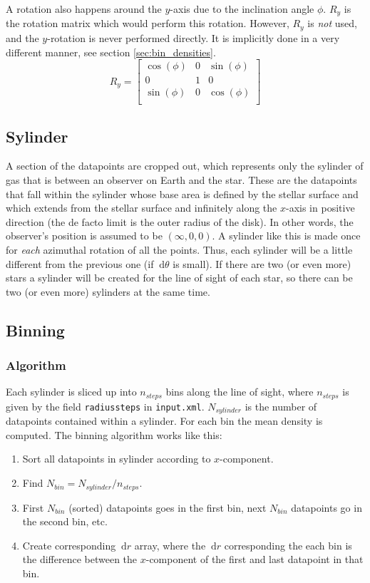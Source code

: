\documentclass[a4paper, 12pt, english, titlepage]{article}
\newcommand{\D}[1]{\ \mathrm{d}#1} %
\begin{document}
    A rotation also happens around the $y$-axis due to the inclination angle $\phi$. $R_y$ is the rotation matrix which would perform this rotation. However, $R_y$ is \emph{not} used, and the $y$-rotation is never performed directly. It is implicitly done in a very different manner, see section \vref{sec:bin_densities}.
    $$
    R_y = \begin{bmatrix}
        \cos(\phi) &          0 & \sin(\phi) \\
                 0 &          1 &          0 \\
        \sin(\phi) &          0 & \cos(\phi) \\
    \end{bmatrix}
    $$

\subsection{Sylinder}
    A section of the datapoints are cropped out, which represents only the sylinder of gas that is between an observer on Earth and the star. These are the datapoints that fall within the sylinder whose base area is defined by the stellar surface and which extends from the stellar surface and infinitely along the $x$-axis in positive direction (the de facto limit is the outer radius of the disk). In other words, the observer's position is assumed to be $(\infty, 0, 0)$. A sylinder like this is made once for \emph{each} azimuthal rotation of all the points. Thus, each sylinder will be a little different from the previous one (if $\D\theta$ is small). If there are two (or even more) stars a sylinder will be created for the line of sight of each star, so there can be two (or even more) sylinders at the same time.

\subsection{Binning}

    \subsubsection{Algorithm}
        Each sylinder is sliced up into $n_{steps}$ bins along the line of sight, where $n_{steps}$ is given by the field \texttt{radiussteps} in \texttt{input.xml}. $N_{sylinder}$ is the number of datapoints contained within a sylinder. For each bin the mean density is computed. The binning algorithm works like this:
        \begin{enumerate}
            \item Sort all datapoints in sylinder according to $x$-component.
            \item Find $N_{bin} = N_{sylinder} / n_{steps}$.
            \item First $N_{bin}$ (sorted) datapoints goes in the first bin, next $N_{bin}$ datapoints go in the second bin, etc.
            \item Create corresponding $\D r$ array, where the $\D r$ corresponding the each bin is the difference between the $x$-component of the first and last datapoint in that bin.
        \end{enumerate}
\end{document}
